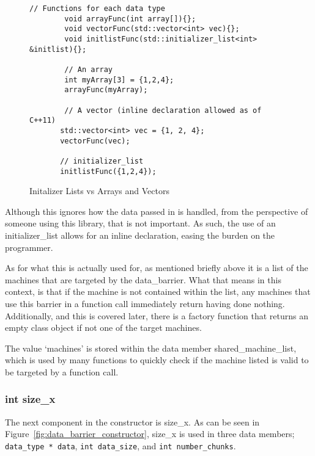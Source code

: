\documentclass[../thesis.tex]{subfiles}
\begin{document}
     \begin{figure}[htbp]
      \centering

      \lstset{language=cpp}  
      \begin{lstlisting}[tabsize=2]
        // Functions for each data type
        void arrayFunc(int array[]){};
        void vectorFunc(std::vector<int> vec){};
        void initlistFunc(std::initializer_list<int> &initlist){};

        // An array
        int myArray[3] = {1,2,4};
        arrayFunc(myArray);

        // A vector (inline declaration allowed as of C++11)
       std::vector<int> vec = {1, 2, 4};
       vectorFunc(vec);

       // initializer_list
       initlistFunc({1,2,4});
        \end{lstlisting}

      \caption{Initalizer Lists vs Arrays and Vectors}
      \label{fig:init_list_vs_others}
    \end{figure}

    Although this ignores how the data passed in is handled, from the perspective of someone using this library, that is not important. As such, the use of an initializer\_list allows for an inline declaration, easing the burden on the programmer.

    As for what this is actually used for, as mentioned briefly above it is a list of the machines that are targeted by the data\_barrier. What that means in this context, is that if the machine is not contained within the list, any machines that use this barrier in a function call immediately return having done nothing. Additionally, and this is covered later, there is a factory function that returns an empty class object if not one of the target machines.

    The value `machines' is stored within the data member shared\_machine\_list, which is used by many functions to quickly check if the machine listed is valid to be targeted by a function call.

  \subsubsection{int size\_x} %
  \label{ssub:int_size_x}
      The next component in the constructor is size\_x. As can be seen in Figure~\ref{fig:data_barrier_constructor}, size\_x is used in three data members; \texttt{data\_type * data}, \texttt{int data\_size}, and \texttt{int number\_chunks}.
\end{document}
